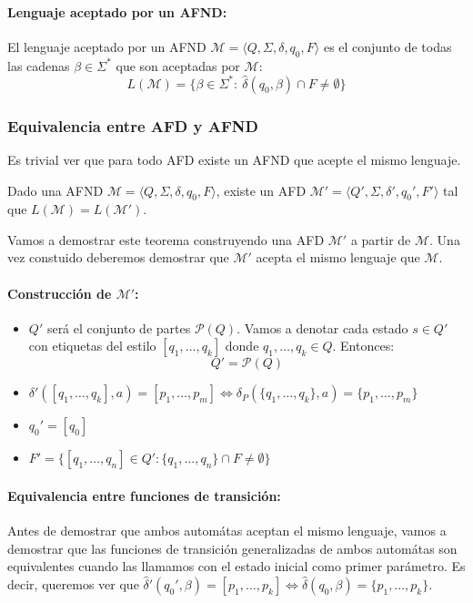 \paragraph{Lenguaje aceptado por un AFND:} El lenguaje aceptado por un AFND \(\mathcal{M} = \langle Q, \Sigma, \delta, q_0, F\rangle\) es el conjunto de todas las cadenas \(\beta\in\Sigma^*\) que son aceptadas por \(\mathcal{M}\):
\[ L(\mathcal{M}) = \{ \beta\in\Sigma^*:~\hat{\delta}(q_0,\beta)\cap F \neq \emptyset\}\]

\subsubsection{Equivalencia entre AFD y AFND}
Es trivial ver que para todo AFD existe un AFND que acepte el mismo lenguaje.

\begin{teorema}
  Dado una AFND \(\mathcal{M} = \langle Q, \Sigma, \delta, q_0, F\rangle\), existe un AFD \(\mathcal{M}' = \langle Q', \Sigma, \delta', q_0', F'\rangle\) tal que \(L(\mathcal{M}) = L(\mathcal{M}')\).
\end{teorema}
Vamos a demostrar este teorema construyendo una AFD \(\mathcal{M}'\) a partir de \(\mathcal{M}\). Una vez constuido deberemos demostrar que \(\mathcal{M}'\) acepta el mismo lenguaje que \(\mathcal{M}\).

\paragraph{Construcción de \(\mathcal{M}'\):}
\begin{itemize}
  \item \(Q'\) será el conjunto de partes \(\mathcal{P}(Q)\). Vamos a denotar cada estado \(s\in Q'\) con etiquetas del estilo \([q_1,\dots, q_k]\) donde \(q_1,\dots,q_k\in Q\). Entonces:
        \[ Q' = \mathcal{P}(Q)\]
  \item \(\delta'([q_1,\dots, q_k],a) = [p_1, \dots, p_m] \iff \delta_P(\{q_1,\dots,q_k\},a) = \{p_1,\dots,p_m\}\)
  \item \(q_0' = [q_0]\)
  \item \(F' = \{ [q_1,\dots, q_n]\in Q' : \{q_1,\dots,q_n\}\cap F \neq \emptyset\}\)
\end{itemize}

\paragraph{Equivalencia entre funciones de transición:} Antes de demostrar que ambos automátas aceptan el mismo lenguaje, vamos a demostrar que las funciones de transición generalizadas de ambos automátas son equivalentes cuando las llamamos con el estado inicial como primer parámetro. Es decir, queremos ver que \(\hat{\delta}'(q_0',\beta) = [p_1,\dots,p_k] \iff \hat{\delta}(q_0,\beta) = \{p_1,\dots, p_k\}\).

